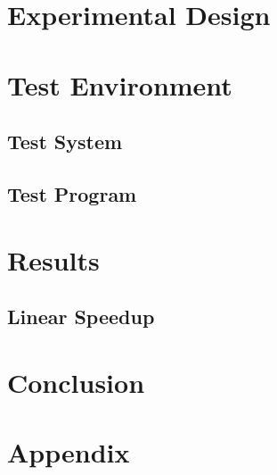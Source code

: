 \documentclass[notitlepage, twocolumn]{article}
\begin{document}
\section{Experimental Design}

\section{Test Environment}

\subsection{Test System}

\subsection{Test Program}

\section{Results}

\subsection{Linear Speedup}

\section{Conclusion}

\section*{Appendix}
\end{document}
